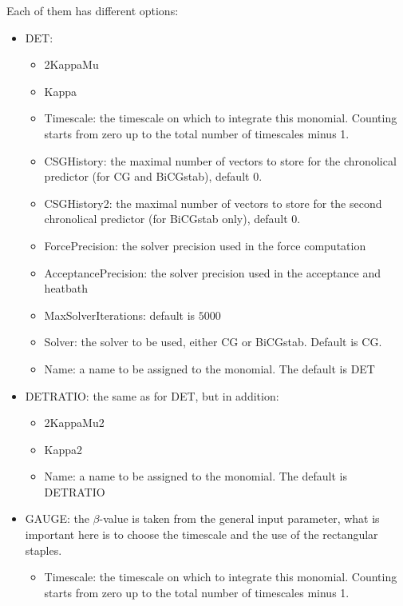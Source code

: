 Each of them has different options:
\begin{itemize}
\item {\ttfamily DET}:
  \begin{itemize}
  \item {\ttfamily 2KappaMu}
  \item {\ttfamily Kappa}
  \item {\ttfamily Timescale}: the timescale on which to integrate
    this monomial. Counting starts from zero up to the total number of
    timescales minus 1.
  \item {\ttfamily CSGHistory}: the maximal number of vectors to store
    for the chronolical predictor (for CG and BiCGstab), default $0$.
  \item {\ttfamily CSGHistory2}: the maximal number of vectors to store
    for the second chronolical predictor (for BiCGstab only), default
    $0$.
  \item {\ttfamily ForcePrecision}: the solver precision used in the
    force computation
  \item {\ttfamily AcceptancePrecision}: the solver precision used in the
    acceptance and heatbath
  \item {\ttfamily MaxSolverIterations}: default is $5000$
  \item {\ttfamily Solver}: the solver to be used, either CG or
    BiCGstab. Default is CG.
  \item {\ttfamily Name}: a name to be assigned to the monomial. The
    default is {\ttfamily DET}
  \end{itemize}
\item {\ttfamily DETRATIO}: the same as for {\ttfamily DET}, but in
  addition:
  \begin{itemize}
  \item {\ttfamily 2KappaMu2}
  \item {\ttfamily Kappa2}
  \item {\ttfamily Name}: a name to be assigned to the monomial. The
    default is {\ttfamily DETRATIO}
  \end{itemize}
\item {\ttfamily GAUGE}: the $\beta$-value is taken from the general
  input parameter, what is important here is to choose the timescale
  and the use of the rectangular staples.
  \begin{itemize}
  \item {\ttfamily Timescale}: the timescale on which to integrate
    this monomial. Counting starts from zero up to the total number of
    timescales minus 1.

\end{itemize}
\end{itemize}
